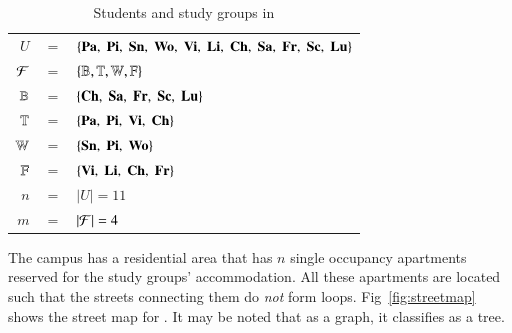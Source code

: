 \documentclass[MS,synopsis]{iitmdiss}
\begin{document}

\def \figtabsize {\footnotesize}

\begin{table}[htbp]
  \centering
{
  \begin{tabular}{rcl}
    $U $&$=$&$ \{{\bf Pa},\; {\bf Pi},\; {\bf Sn},\; {\bf Wo},\; {\bf Vi},\; {\bf Li},\; {\bf Ch},\;
    {\bf Sa},\; {\bf Fr},\; {\bf Sc},\; {\bf Lu}\}$\\
    ${\cal F} $&$=$&$ \{\mathbb{B}, \mathbb{T}, \mathbb{W}, \mathbb{F}\}$\\
    $\mathbb{B} $&$=$&$ \{{\bf Ch},\;  {\bf Sa},\;  {\bf Fr},\;  {\bf Sc},\;  {\bf Lu} \}$\\
    $\mathbb{T} $&$=$&$ \{{\bf Pa},\;  {\bf Pi},\;  {\bf Vi},\;  {\bf Ch} \}$\\
    $\mathbb{W} $&$=$&$ \{{\bf Sn},\;  {\bf Pi},\;  {\bf Wo} \}$\\
    $\mathbb{F} $&$=$&$ \{{\bf Vi},\;  {\bf Li},\;  {\bf Ch},\;  {\bf Fr} \}$\\
    $n $&$=$&$ |U| = 11$\\
    $m $&$=$&$ |{\cal F}| = 4$      
  \end{tabular}
}
  \caption{\figtabsize Students and study groups in \WSI}
  \label{tab:wsigroups}
\end{table}

The campus has a residential area {\residenceblock} that has $n$
single occupancy apartments reserved for the study groups'
accommodation.  All these apartments are located such that the streets
connecting them do {\em not} form loops. Fig~\ref{fig:streetmap} shows
the street map for {\residenceblock}. It may be noted that as a graph,
it classifies as a tree.
\end{document}
